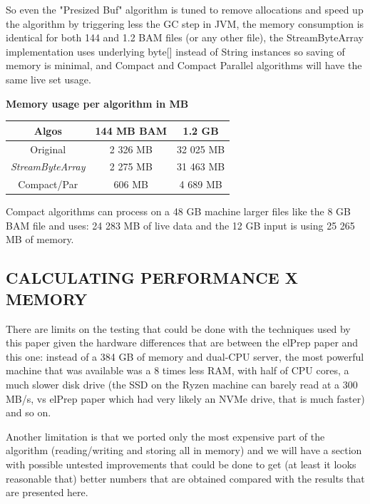 \documentclass[a4paper,twoside]{article}
\begin{document}
So even the "Presized Buf" algorithm is tuned to remove allocations and speed up the algorithm by triggering less the GC step in JVM, the memory consumption is identical for both 144 and 1.2 BAM files (or any other file), the StreamByteArray implementation uses underlying byte[] instead of String instances so saving of memory is minimal, and Compact and Compact Parallel algorithms will have the same live set usage.


\begin{small}
	\par
	\textbf{Memory usage per algorithm in MB} \\
	\vspace{-0.4cm}
	\begin{center}
		\begin{tabular}{|c|c|c|}
			\hline
			Algos  	    	 	& 144 MB BAM		& 1.2 GB			\\ \hline
			Original				& 2 326 MB			& 32 025 MB			\\ \hline
			{\it StreamByteArray}	& 2 275 MB			& 31 463 MB			\\ \hline
			Compact/Par				& 606 MB			& 4 689 MB			\\ \hline
		\end{tabular}
	\end{center}
\end{small}

Compact algorithms can process on a 48 GB machine larger files like the 8 GB BAM file and uses:
24 283 MB of live data and the 12 GB input is using 25 265 MB of memory.

\subsection{\uppercase{Calculating performance x memory}}
There are limits on the testing that could be done with the techniques used by this paper given the hardware differences that are between the elPrep paper and this one: instead of a 384 GB of memory and dual-CPU server,
the most powerful machine that was available was a 8 times less RAM, with half of CPU cores, a much
slower disk drive (the SSD on the Ryzen machine can barely read at a 300 MB/s, vs elPrep paper which had
very likely an NVMe drive, that is much faster) and so on.

Another limitation is that we ported only the most expensive part of the algorithm (reading/writing and storing all in memory) and we will have a section with possible untested improvements that could be done
to get (at least it looks reasonable that) better numbers that are obtained compared with the results that are presented here.
\end{document}
